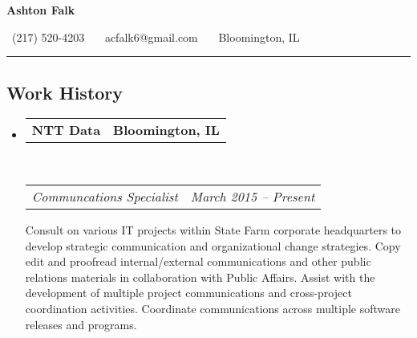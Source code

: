 \documentclass[10pt,letterpaper]{article}
\makeatletter
\newcommand{\headerrow}[2]
{\begin{tabular*}{\linewidth}{l@{\extracolsep{\fill}}r}
	#1 &
	#2 \\
\end{tabular*}}
\makeatother
\begin{document}
\begin{center}
{\LARGE \textbf{Ashton Falk}}

\ (217) 520-4203 \ \textbullet \ \ acfalk6@gmail.com \ \textbullet \ \ Bloomington, IL
\end{center}

\hrule
\vspace{-0.4em}
\subsection*{Work History}

\begin{itemize}
	\parskip=0.1em

	\item
	\headerrow
		{\textbf{NTT Data}}
		{\textbf{Bloomington, IL}}
	\\
	\headerrow
		{\emph{Communcations Specialist}}
		{\emph{March 2015 -- Present}}
        Consult on various IT projects within State Farm corporate headquarters to develop strategic communication and
        organizational change strategies. Copy edit and proofread internal/external communications and other public
        relations materials in collaboration with Public Affairs. Assist with the development of multiple project 
        communications and cross-project coordination activities. Coordinate communications across multiple software
        releases and programs.


\end{itemize}
\end{document}
